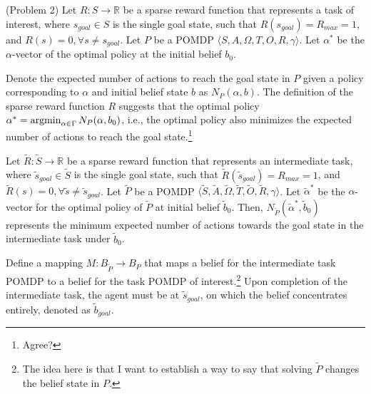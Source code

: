 \documentclass{article}
\newcommand{\td}[1]{\tilde{#1}}
\begin{document}
\begin{definition}(Problem 2)
Let $R:S\rightarrow \mathbb{R}$ be a sparse reward function that represents a
task of interest, where $s_{goal}\in S$ is the single goal state, such that
$R(s_{goal})=R_{max}=1$, and $R(s)=0, \forall s \neq s_{goal}$. Let $P$ be a POMDP $\langle S, A, \Omega, T, O, R, \gamma  \rangle$. Let $\alpha^*$ be the $\alpha$-vector of the optimal policy at the initial belief $b_0$.

Denote the expected number of actions to reach the goal state in $P$ given a policy corresponding to $\alpha$ and initial belief state $b$ as $N_P(\alpha, b)$. The definition of the sparse reward function $R$ suggests that the optimal policy $\alpha^*=\operatorname*{argmin}_{\alpha\in\Gamma}N_P(\alpha, b_0)$, i.e., the optimal policy also minimizes the expected number of actions to reach the goal state.\footnote{Agree?}



Let $\td{R}:\td{S}\rightarrow \mathbb{R}$ be a sparse reward function that represents an intermediate task, where $\td{s}_{goal}\in \td{S}$ is the single goal state, such that
$\td{R}(\td{s}_{goal})=R_{max}=1$, and $\td{R}(s)=0, \forall \td{s} \neq \td{s}_{goal}$. Let $\td{P}$ be a POMDP $\langle \td{S}, \td{A}, \td{\Omega}, \td{T}, \td{O}, \td{R}, \gamma  \rangle$. Let $\td{\alpha}^*$ be the $\alpha$-vector for the optimal policy of $\td{P}$ at initial belief $\td{b}_0$. Then, $N_{\td{P}}(\td{\alpha}^*, \td{b}_0)$ represents the minimum expected number of actions towards the goal state in the intermediate task under $\td{b}_0$.

Define a mapping $M:B_{\td{P}}\rightarrow B_{P}$ that maps a belief for the intermediate task POMDP to a belief for the task POMDP of interest.\footnote{The idea here is that I want to establish a way to say that solving $\td{P}$ changes the belief state in $P$.}
Upon completion of the intermediate task, the agent must be at $\td{s}_{goal}$, on which the belief concentrates entirely, denoted as $\td{b}_{goal}$.


\end{definition}
\end{document}
